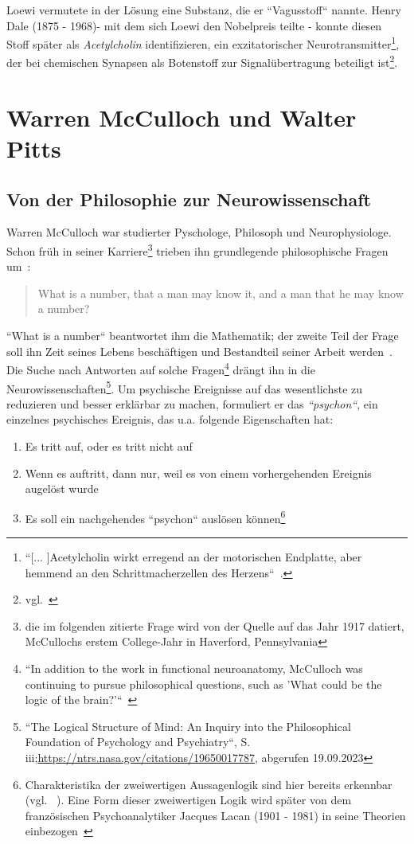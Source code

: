 Loewi vermutete in der Lösung eine Substanz, die er ``Vagusstoff`` nannte.
Henry Dale (1875 - 1968)- mit dem sich Loewi den Nobelpreis teilte - konnte diesen Stoff später als \textit{Acetylcholin} identifizieren, ein exzitatorischer Neurotransmitter\footnote{
    ``[... ]Acetylcholin wirkt erregend an der motorischen Endplatte, aber hemmend an den Schrittmacherzellen des Herzens``~\cite[105]{HS19b}.
}, der bei chemischen Synapsen als Botenstoff zur Signalübertragung beteiligt ist\footnote{
    vgl.~\cite[119, Exkurs 5.1]{BCP18}
}.

\section{Warren McCulloch und Walter Pitts}\label{appendix:mcculloch}
\subsection*{Von der Philosophie zur Neurowissenschaft}

Warren McCulloch war studierter Pyschologe, Philosoph und Neurophysiologe.
Schon früh in seiner Karriere\footnote{
    die im folgenden zitierte Frage wird von der Quelle auf das Jahr 1917 datiert, McCullochs erstem College-Jahr in Haverford, Pennsylvania
} trieben ihn grundlegende philosophische Fragen um~\cite[1]{Arb19}:

\blockquote[{\cite[2]{Mcc16}}]{
    What is a number, that a man may know it, and a man that he may know a number{?}
}

\noindent
``What is a number`` beantwortet ihm die Mathematik; der zweite Teil der Frage soll ihn Zeit seines Lebens beschäftigen und Bestandteil seiner Arbeit werden~\cite[4 f.]{Abr02}.
Die Suche nach Antworten auf solche Fragen\footnote{
    ``In addition to the work in functional neuroanatomy, McCulloch was continuing to pursue philosophical questions, such as 'What could be the logic of the brain?'``~\cite[3]{Arb19}
} drängt ihn in die Neurowissenschaften\footnote{
``The Logical Structure of Mind: An Inquiry into the Philosophical Foundation of Psychology and Psychiatry``, S. iii;\url{https://ntrs.nasa.gov/citations/19650017787}, abgerufen 19.09.2023

}.
Um psychische Ereignisse auf das wesentlichste zu reduzieren und besser erklärbar zu machen, formuliert er das \textit{``psychon``}, ein einzelnes psychisches Ereignis, das u.a. folgende Eigenschaften hat:

\begin{enumerate}
    \item Es tritt auf, oder es tritt nicht auf
    \item Wenn es auftritt, dann nur, weil es von einem vorhergehenden Ereignis augelöst wurde
    \item Es soll ein nachgehendes ``psychon`` auslösen können\footnote{
        Charakteristika der zweiwertigen Aussagenlogik sind hier bereits erkennbar (vgl. ~\cite[7]{Abr02}). Eine Form dieser zweiwertigen Logik wird später von dem französischen Psychoanalytiker Jacques Lacan (1901 - 1981) in seine Theorien einbezogen~\cite[317]{Liu10}
    }
\end{enumerate}


